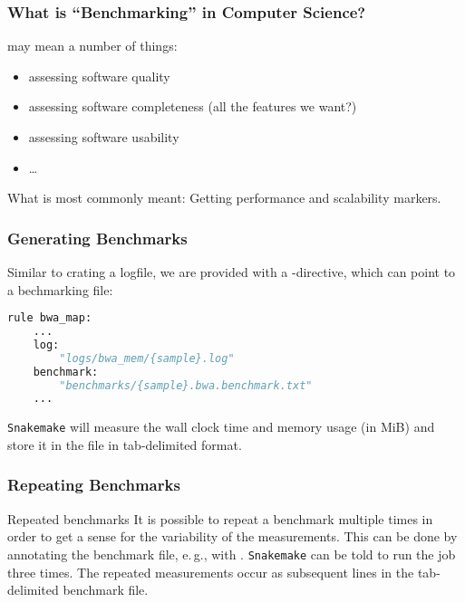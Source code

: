 \begin{frame}
  \frametitle{What is ``Benchmarking'' in Computer Science?}
   may mean a number of things:
  \begin{itemize}[<+->]
   \item assessing software quality
   \item assessing software completeness (all the features we want?)
   \item assessing software usability
   \item \ldots
  \end{itemize}
  \pause
  \begin{docs}
  	What is most commonly meant: Getting performance and scalability markers.
  \end{docs}
\end{frame}

\begin{frame}[fragile]
  \frametitle{Generating Benchmarks}
  Similar to crating a logfile, we are provided with a -directive, which can point to a bechmarking file:
  \begin{lstlisting}[language=Python,style=Python]
rule bwa_map:
    ...
    log:
        "logs/bwa_mem/{sample}.log"
    benchmark:
        "benchmarks/{sample}.bwa.benchmark.txt"
    ...
  \end{lstlisting} 
  \begin{docs}
  	\texttt{Snakemake} will measure the wall clock time and memory usage (in MiB) and store it in the file in tab-delimited format.
  \end{docs}
\end{frame}

\begin{frame}[fragile]
  \frametitle{Repeating Benchmarks}
  \vfill
  \begin{exampleblock}{Repeated benchmarks}
   It is possible to repeat a benchmark multiple times in order to get a sense for the variability of the measurements. This can be done by annotating the benchmark file, e.\,g., with . \texttt{Snakemake} can be told to run the job three times. The repeated measurements occur as subsequent lines in the tab-delimited benchmark file.
  \end{exampleblock}
  \vfill
\end{frame} 

